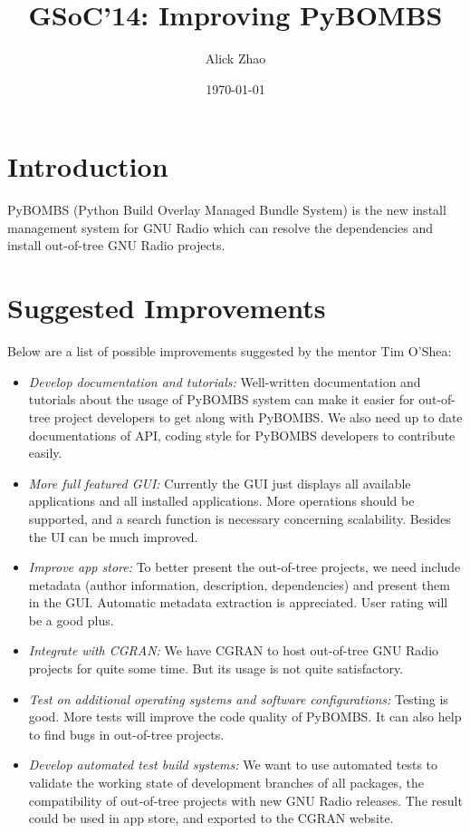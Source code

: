 \documentclass[a4paper]{article}
\begin{document}
\title{GSoC'14: Improving PyBOMBS}
\author{Alick Zhao}
\date{\today}
\maketitle

\section{Introduction}

PyBOMBS (Python Build Overlay Managed Bundle System) is the new install
management system for GNU Radio which can resolve the dependencies and
install out-of-tree GNU Radio projects.

\section{Suggested Improvements}

Below are a list of possible improvements suggested by the mentor Tim O'Shea:

\begin{itemize}
  \item \emph{Develop documentation and tutorials:} Well-written
    documentation and tutorials about the usage of PyBOMBS system
    can make it easier for out-of-tree
    project developers to get along with PyBOMBS.
    We also need up to date documentations of API, coding style for
    PyBOMBS developers to contribute easily.
  \item \emph{More full featured GUI:} Currently the GUI just displays
    all available applications and all installed applications.
    More operations should be supported, and a search function is
    necessary concerning scalability. Besides the UI can be much
    improved.
  \item \emph{Improve app store:} To better present the out-of-tree
    projects, we need include metadata (author information, description,
    dependencies) and present them in the GUI. Automatic metadata
    extraction is appreciated. User rating will be a good plus.
  \item \emph{Integrate with CGRAN:} We have CGRAN to host out-of-tree
    GNU Radio projects for quite some time. But its usage is not quite
    satisfactory.
  \item \emph{Test on additional operating systems and software
    configurations:} Testing is good. More tests will improve the code quality of
    PyBOMBS\@. It can also help to find bugs in out-of-tree projects.
  \item \emph{Develop automated test build systems:} We want to use
    automated tests to validate the working state of development
    branches of all packages, the compatibility of out-of-tree projects
    with new GNU Radio releases. The result
    could be used in app store, and exported to the CGRAN website.
\end{itemize}
\end{document}
